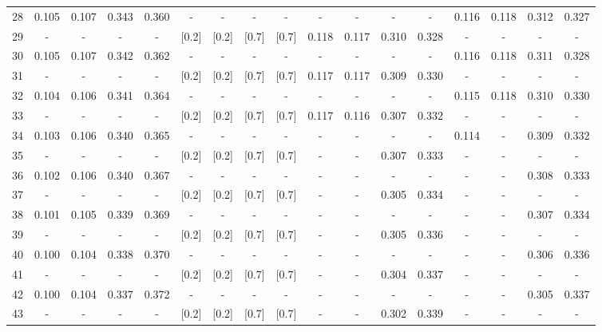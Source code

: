 \documentclass{report}
\begin{document}
\begin{appendices}
\begin{table}
\begin{tabular}{|c|cccc|cccc|cccc|cccc|}
28 & 0.105 & 0.107 & 0.343 & 0.360 &   -   &   -   &   -   &   -   &   -   &   -   &   -   &   -   & 0.116 & 0.118 & 0.312 & 0.327\\
29 &   -   &   -   &   -   &   -   & [0.2] & [0.2] & [0.7] & [0.7] & 0.118 & 0.117 & 0.310 & 0.328 &   -   &   -   &   -   &   -  \\
30 & 0.105 & 0.107 & 0.342 & 0.362 &   -   &   -   &   -   &   -   &   -   &   -   &   -   &   -   & 0.116 & 0.118 & 0.311 & 0.328\\
31 &   -   &   -   &   -   &   -   & [0.2] & [0.2] & [0.7] & [0.7] & 0.117 & 0.117 & 0.309 & 0.330 &   -   &   -   &   -   &   -  \\
32 & 0.104 & 0.106 & 0.341 & 0.364 &   -   &   -   &   -   &   -   &   -   &   -   &   -   &   -   & 0.115 & 0.118 & 0.310 & 0.330\\
33 &   -   &   -   &   -   &   -   & [0.2] & [0.2] & [0.7] & [0.7] & 0.117 & 0.116 & 0.307 & 0.332 &   -   &   -   &   -   &   -  \\
34 & 0.103 & 0.106 & 0.340 & 0.365 &   -   &   -   &   -   &   -   &   -   &   -   &   -   &   -   & 0.114 &   -   & 0.309 & 0.332\\
35 &   -   &   -   &   -   &   -   & [0.2] & [0.2] & [0.7] & [0.7] &   -   &   -   & 0.307 & 0.333 &   -   &   -   &   -   &   -  \\
36 & 0.102 & 0.106 & 0.340 & 0.367 &   -   &   -   &   -   &   -   &   -   &   -   &   -   &   -   &   -   &   -   & 0.308 & 0.333\\
37 &   -   &   -   &   -   &   -   & [0.2] & [0.2] & [0.7] & [0.7] &   -   &   -   & 0.305 & 0.334 &   -   &   -   &   -   &   -  \\
38 & 0.101 & 0.105 & 0.339 & 0.369 &   -   &   -   &   -   &   -   &   -   &   -   &   -   &   -   &   -   &   -   & 0.307 & 0.334\\
39 &   -   &   -   &   -   &   -   & [0.2] & [0.2] & [0.7] & [0.7] &   -   &   -   & 0.305 & 0.336 &   -   &   -   &   -   &   -  \\
40 & 0.100 & 0.104 & 0.338 & 0.370 &   -   &   -   &   -   &   -   &   -   &   -   &   -   &   -   &   -   &   -   & 0.306 & 0.336\\
41 &   -   &   -   &   -   &   -   & [0.2] & [0.2] & [0.7] & [0.7] &   -   &   -   & 0.304 & 0.337 &   -   &   -   &   -   &   -  \\
42 & 0.100 & 0.104 & 0.337 & 0.372 &   -   &   -   &   -   &   -   &   -   &   -   &   -   &   -   &   -   &   -   & 0.305 & 0.337\\
43 &   -   &   -   &   -   &   -   & [0.2] & [0.2] & [0.7] & [0.7] &   -   &   -   & 0.302 & 0.339 &   -   &   -   &   -   &   -  \\

\end{tabular}
\end{table}
\end{appendices}
\end{document}
